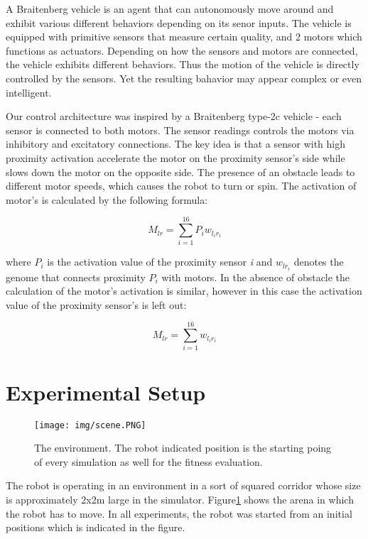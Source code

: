 \documentclass[format=acmsmall, review=false, screen=true]{acmart}
\begin{document}
A Braitenberg vehicle \cite{braitenberg1986vehicles} is an agent that can autonomously move around and exhibit various different behaviors depending on its senor inputs. The vehicle is equipped with primitive sensors that measure certain quality, and 2 motors which functions as actuators. Depending on how the sensors and motors are connected, the vehicle exhibits different behaviors. Thus the motion of the vehicle is directly controlled by the sensors. Yet the resulting bahavior may appear complex or even intelligent.

Our control architecture was inspired by a Braitenberg type-2c vehicle - each sensor is connected to both motors. The sensor readings controls the motors via inhibitory and excitatory connections. The key idea is that a sensor with high proximity activation accelerate the motor on the proximity sensor's side while slows down the motor on the opposite side. The presence of an obstacle leads to different motor speeds, which causes the robot to turn or spin. The activation of motor's is calculated by the following formula:

\[ M_{lr} = \sum_{i=1}^{16} P_{i} w_{l_i r_i} \]

where \(P_{i}\) is the activation value of the proximity sensor \emph{i} and \(w_{lr_i}\) denotes the genome that connects proximity \(P_{i}\) with motors. In the absence of obstacle the calculation of the motor's activation is similar, however in this case the activation value of the proximity sensor's is left out:

\[ M_{lr} = \sum_{i=1}^{16} w_{l_i r_i} \]

\section{Experimental Setup}

\begin{figure}[H]
  \texttt{[image: img/scene.PNG]}
  \caption{The environment. The robot indicated position is the starting poing of every simulation as well for the fitness evaluation.}
  \label{fig:arena-scene}
\end{figure}

The robot is operating in an environment in a sort of squared corridor whose size is approximately 2x2m large in the simulator. Figure\ref{fig:arena-scene} shows the arena in which the robot has to move. In all experiments, the robot was started from an initial positions which is indicated in the figure.
\end{document}

